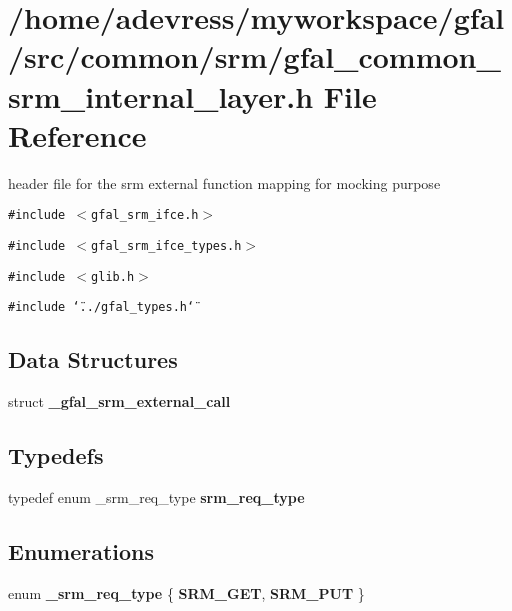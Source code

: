 \section{/home/adevress/myworkspace/gfal/src/common/srm/gfal\_\-common\_\-srm\_\-internal\_\-layer.h File Reference}
\label{gfal__common__srm__internal__layer_8h}
header file for the srm external function mapping for mocking purpose 

{\tt \#include $<$gfal\_\-srm\_\-ifce.h$>$}\par
{\tt \#include $<$gfal\_\-srm\_\-ifce\_\-types.h$>$}\par
{\tt \#include $<$glib.h$>$}\par
{\tt \#include \char`\"{}../gfal\_\-types.h\char`\"{}}\par
\subsection*{Data Structures}
\begin{CompactItemize}
\item 
struct \bf{\_\-gfal\_\-srm\_\-external\_\-call}
\end{CompactItemize}
\subsection*{Typedefs}
\begin{CompactItemize}
\item 
typedef enum \_\-srm\_\-req\_\-type \textbf{srm\_\-req\_\-type}\label{gfal__common__srm__internal__layer_8h_916c9454af7600d1ab17c17a22fbc0fa}

\end{CompactItemize}
\subsection*{Enumerations}
\begin{CompactItemize}
\item 
enum \textbf{\_\-srm\_\-req\_\-type} \{ \textbf{SRM\_\-GET}, 
\textbf{SRM\_\-PUT}
 \}
\end{CompactItemize}

